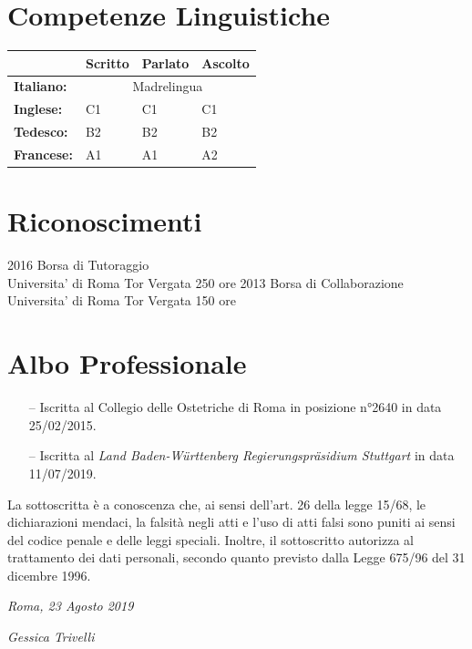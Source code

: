 \documentclass[11pt]{friggeri-cv}
\begin{document}
\section{Competenze Linguistiche}
\begin{table}[!h]
  \centering
  \renewcommand{\arraystretch}{1.45}
  \begin{tabular}{ p{3cm} p{3cm} p{3cm} p{3cm} }
    \hline
    & \textbf{Scritto}  & \textbf{Parlato} & \textbf{Ascolto}     \\     \hline
    \textbf{Italiano:}  & \multicolumn{3}{c}{Madrelingua}         \\
    \textbf{Inglese:}   & C1 & C1 & C1                            \\ 
    \textbf{Tedesco:}   & B2 & B2 & B2                            \\ 
    \textbf{Francese:}  & A1 & A1 & A2                            \\    \hline
  \end{tabular}
\end{table}

\newpage
\section{Riconoscimenti}
\begin{entrylist}
  \entry
    {2016}
    {Borsa di Tutoraggio}
    {\\Universita' di Roma Tor Vergata}
    {250 ore}
  \entry
    {2013}
    {Borsa di Collaborazione}
    {\\Universita' di Roma Tor Vergata}
    {150 ore}
\end{entrylist}

\vspace{-10pt}
\section{Albo Professionale}
\begin{itemize}
  \item[--] Iscritta al Collegio delle Ostetriche di Roma in posizione 
  n°2640 in data 25/02/2015.
  \item[--] Iscritta al \emph{Land Baden-W{\"u}rttenberg 
  Regierungspr{\"a}sidium Stuttgart} in data 11/07/2019.
\end{itemize}

\vspace{75pt}
\footnotesize La sottoscritta è a conoscenza che, ai sensi dell’art. 26 della legge 
15/68, le dichiarazioni mendaci, la falsità negli atti e l’uso di
atti falsi sono puniti ai sensi del codice penale e delle leggi speciali. Inoltre, il 
sottoscritto autorizza al trattamento dei dati
personali, secondo quanto previsto dalla Legge 675/96 del 31 dicembre 1996.

\vspace{75pt}
\begin{flushleft}
\large\emph{Roma, 23 Agosto 2019}
\end{flushleft}
\begin{flushright}
\large\emph{Gessica Trivelli}
\end{flushright}
\end{document}
